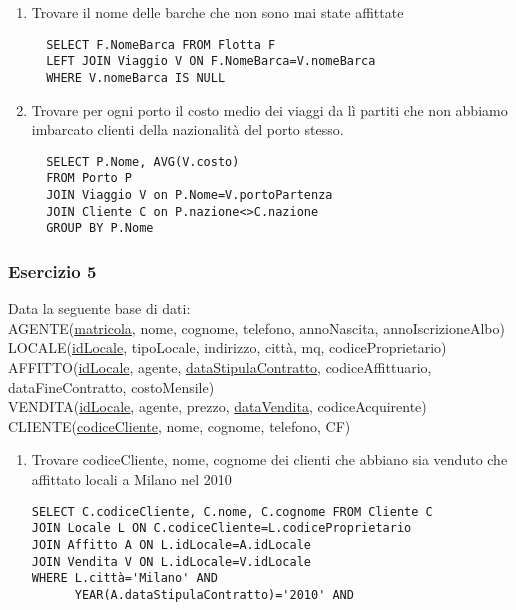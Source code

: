 \documentclass[a4paper]{article}
\begin{document}
\begin{enumerate}
\begin{enumerate}
\begin{verbatim}
  JOIN Viaggio V1 ON P.nazione = V.portoPartenza
  JOIN Viaggio V2 ON P.nazione = V.portoArrivo
  GROUP BY P.nazione;\par   SELECT I.nazione FROM Info I
  WHERE I.Conteggio = SELECT(MAX(I1.Conteggio) FROM Info I1)
  \end{verbatim}
\item Trovare il nome delle barche che non sono mai state affittate
  \begin{verbatim}
  SELECT F.NomeBarca FROM Flotta F
  LEFT JOIN Viaggio V ON F.NomeBarca=V.nomeBarca
  WHERE V.nomeBarca IS NULL
  \end{verbatim}
\item Trovare per ogni porto il costo medio dei viaggi da lì partiti che non abbiamo imbarcato clienti della nazionalità del porto stesso.
  \begin{verbatim}
  SELECT P.Nome, AVG(V.costo)
  FROM Porto P
  JOIN Viaggio V on P.Nome=V.portoPartenza
  JOIN Cliente C on P.nazione<>C.nazione
  GROUP BY P.Nome
  \end{verbatim}
\end{enumerate}\par \subsubsection{Esercizio 5}
Data la seguente base di dati:\medskip\\
AGENTE(\underline{matricola}, nome, cognome, telefono, annoNascita, annoIscrizioneAlbo)\\
LOCALE(\underline{idLocale}, tipoLocale, indirizzo, città, mq, codiceProprietario)\\
AFFITTO(\underline{idLocale}, agente, \underline{dataStipulaContratto}, codiceAffittuario, dataFineContratto, costoMensile)\\
VENDITA(\underline{idLocale}, agente, prezzo, \underline{dataVendita}, codiceAcquirente)\\
CLIENTE(\underline{codiceCliente}, nome, cognome, telefono, CF)\medskip
\begin{enumerate}
\item Trovare codiceCliente, nome, cognome dei clienti che abbiano sia venduto che affittato locali a Milano nel 2010
\begin{verbatim}
SELECT C.codiceCliente, C.nome, C.cognome FROM Cliente C
JOIN Locale L ON C.codiceCliente=L.codiceProprietario
JOIN Affitto A ON L.idLocale=A.idLocale
JOIN Vendita V ON L.idLocale=V.idLocale
WHERE L.città='Milano' AND
      YEAR(A.dataStipulaContratto)='2010' AND

\end{verbatim}
\end{enumerate}
\end{enumerate}
\end{document}

